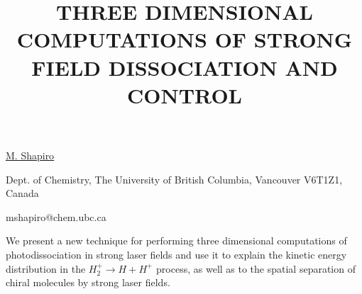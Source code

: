 \title{THREE DIMENSIONAL COMPUTATIONS OF STRONG FIELD DISSOCIATION AND CONTROL}

\underline{M. Shapiro} 

{\normalsize{\vspace{-4mm}
Dept. of Chemistry, The University of British Columbia, Vancouver
V6T1Z1, Canada

\email mshapiro@chem.ubc.ca}}

We present a new technique for performing three dimensional computations of photodissociation in strong laser fields and use it to explain the kinetic energy distribution in the $H_2^+ \rightarrow H +H^+$ process, as well as to the spatial separation of chiral molecules by strong laser fields.

\vspace{\baselineskip}
